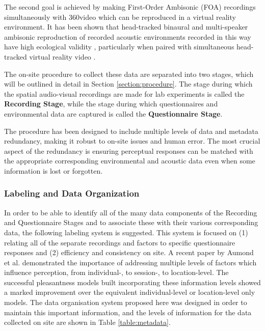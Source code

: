    The second goal is achieved by making First-Order Ambisonic (FOA) recordings simultaneously with 360\degree video which can be reproduced in a virtual reality environment. It has been shown that head-tracked binaural and multi-speaker ambisonic reproduction of recorded acoustic environments recorded in this way have high ecological validity \citep{Davies2014Soundscape}, particularly when paired with simultaneous head-tracked virtual reality video \citep{Hong2017Spatial,Hong2018Quality,DeCoensel2017Urban}.

   The on-site procedure to collect these data are separated into two stages, which will be outlined in detail in Section \ref{section:procedure}. The stage during which the spatial audio-visual recordings are made for lab experiments is called the \textbf{Recording Stage}, while the stage during which questionnaires and environmental data are captured is called the \textbf{Questionnaire Stage}.

   The procedure has been designed to include multiple levels of data and metadata redundancy, making it robust to on-site issues and human error. The most crucial aspect of the redundancy is ensuring perceptual responses can be matched with the appropriate corresponding environmental and acoustic data even when some information is lost or forgotten.

   \subsubsection{Labeling and Data Organization}
     \label{section:metadata}
     In order to be able to identify all of the many data components of the Recording and Questionnaire Stages and to associate these with their various corresponding data, the following labeling system is suggested. This system is focused on (1) relating all of the separate recordings and factors to specific questionnaire responses and (2) efficiency and consistency on site. A recent paper by Aumond et al. \citep{Aumond2017Modeling} demonstrated the importance of addressing multiple levels of factors which influence perception, from individual-, to session-, to location-level. The successful pleasantness models built incorporating these information levels showed a marked improvement over the equivalent individual-level or location-level only models. The data organisation system proposed here was designed in order to maintain this important information, and the levels of information for the data collected on site are shown in Table \ref{table:metadata}.

